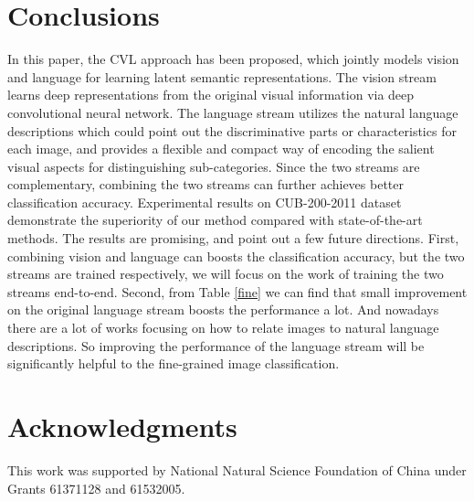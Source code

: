 \documentclass[10pt,twocolumn,letterpaper]{article}
\begin{document}
\section{Conclusions}
In this paper, the CVL approach has been proposed, which jointly models vision and language for learning latent semantic representations. The vision stream learns deep representations from the original visual information via deep convolutional neural network. The language stream utilizes the natural language descriptions which could point out the discriminative parts or characteristics for each image, and provides a flexible and compact way of encoding the salient visual aspects for distinguishing sub-categories. Since the two streams are complementary, combining the two streams can further achieves better classification accuracy. Experimental results on CUB-200-2011 dataset demonstrate the superiority of our method compared with state-of-the-art methods. The results are promising, and point out a few future directions. First, combining vision and language can boosts the classification accuracy, but the two streams are trained respectively, we will focus on the work of training the two streams end-to-end. Second, from Table \ref{fine} we can find that small improvement on the original language stream boosts the performance a lot. And nowadays there are a lot of works focusing on how to relate images to natural language descriptions. So improving the performance of the language stream will be significantly helpful to the fine-grained image classification.
\section{Acknowledgments}
This work was supported by National Natural Science Foundation of China under Grants 61371128 and 61532005.

\balance 
{\small


}
{}
\end{document}

